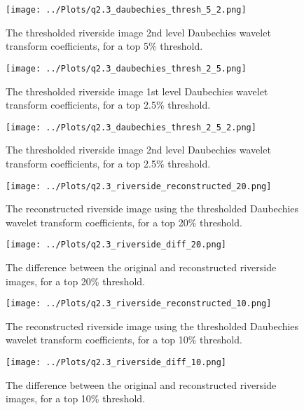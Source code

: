\documentclass[12pt]{report} %
\begin{document}
\begin{figure}[htbp]
    \centering
    \texttt{[image: ../Plots/q2.3\_daubechies\_thresh\_5\_2.png]}
    \caption{The thresholded riverside image 2nd level Daubechies wavelet transform coefficients, for a top 5\% threshold.}
    \label{fig:thresholded_image5_2}
\end{figure}

\begin{figure}[htbp]
    \centering
    \texttt{[image: ../Plots/q2.3\_daubechies\_thresh\_2\_5.png]}
    \caption{The thresholded riverside image 1st level Daubechies wavelet transform coefficients, for a top 2.5\% threshold.}
    \label{fig:thresholded_image2.5}
\end{figure}

\begin{figure}[htbp]
    \centering
    \texttt{[image: ../Plots/q2.3\_daubechies\_thresh\_2\_5\_2.png]}
    \caption{The thresholded riverside image 2nd level Daubechies wavelet transform coefficients, for a top 2.5\% threshold.}
    \label{fig:thresholded_image2.5_2}
\end{figure}


\begin{figure}[htbp]
    \centering
    \texttt{[image: ../Plots/q2.3\_riverside\_reconstructed\_20.png]}
    \caption{The reconstructed riverside image using the thresholded Daubechies wavelet transform coefficients, for a top 20\% threshold.}
    \label{fig:reconstructed_image20}
\end{figure}

\begin{figure}[htbp]
    \centering
    \texttt{[image: ../Plots/q2.3\_riverside\_diff\_20.png]}
    \caption{The difference between the original and reconstructed riverside images, for a top 20\% threshold.}
    \label{fig:diff_image20}
\end{figure}

\begin{figure}[htbp]
    \centering
    \texttt{[image: ../Plots/q2.3\_riverside\_reconstructed\_10.png]}
    \caption{The reconstructed riverside image using the thresholded Daubechies wavelet transform coefficients, for a top 10\% threshold.}
    \label{fig:reconstructed_image10}
\end{figure}

\begin{figure}[htbp]
    \centering
    \texttt{[image: ../Plots/q2.3\_riverside\_diff\_10.png]}
    \caption{The difference between the original and reconstructed riverside images, for a top 10\% threshold.}
    \label{fig:diff_image10}
\end{figure}
\end{document}
